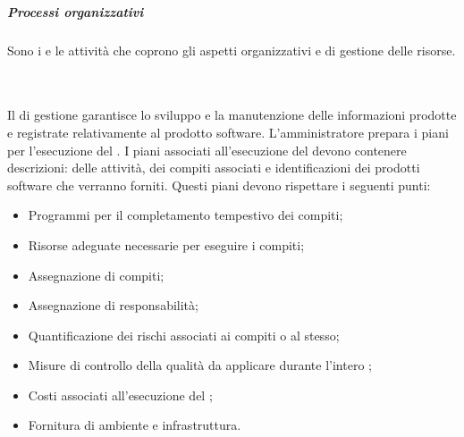 \subparagraph{Processi organizzativi}
Sono i  e le attività che coprono gli aspetti organizzativi e di gestione delle risorse.

\mbox{} \\ \\
Il  di gestione garantisce lo sviluppo e la manutenzione delle informazioni prodotte e registrate relativamente 
al prodotto software. L'amministratore prepara i piani per l'esecuzione del .
I piani associati all'esecuzione del  devono contenere descrizioni: delle attività, dei compiti associati e
identificazioni dei prodotti software che verranno forniti. Questi piani devono rispettare i seguenti punti:
\begin{itemize}
    \item Programmi per il completamento tempestivo dei compiti;
    \item Risorse adeguate necessarie per eseguire i compiti;
    \item Assegnazione di compiti;
    \item Assegnazione di responsabilità;
    \item Quantificazione dei rischi associati ai compiti o al  stesso;
    \item Misure di controllo della qualità da applicare durante l'intero ;
    \item Costi associati all'esecuzione del ;
    \item Fornitura di ambiente e infrastruttura.
\end{itemize}
